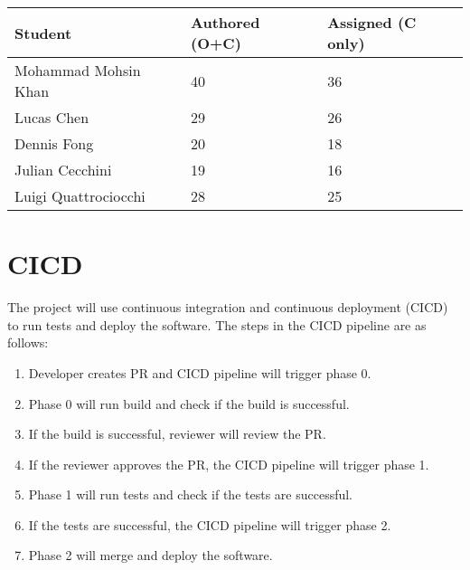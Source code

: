 \documentclass{article}
\begin{document}
\begin{table}[H]
\centering
\begin{tabular}{lll}
\toprule
\textbf{Student} & \textbf{Authored (O+C)} & \textbf{Assigned (C only)}\\
\midrule
Mohammad Mohsin Khan & 40 & 36\\
Lucas Chen & 29 & 26\\
Dennis Fong & 20 & 18\\
Julian Cecchini & 19 & 16\\
Luigi Quattrociocchi & 28 & 25\\
\bottomrule
\end{tabular}
\end{table}

\section{CICD}

The project will use continuous integration and continuous deployment (CICD) to run tests and deploy the software.
The steps in the CICD pipeline are as follows:
\begin{enumerate}
  \item Developer creates PR and CICD pipeline will trigger phase 0.
  \item Phase 0 will run build and check if the build is successful.
  \item If the build is successful, reviewer will review the PR.
  \item If the reviewer approves the PR, the CICD pipeline will trigger phase 1.
  \item Phase 1 will run tests and check if the tests are successful.
  \item If the tests are successful, the CICD pipeline will trigger phase 2.
  \item Phase 2 will merge and deploy the software.
\end{enumerate}



\end{document}
